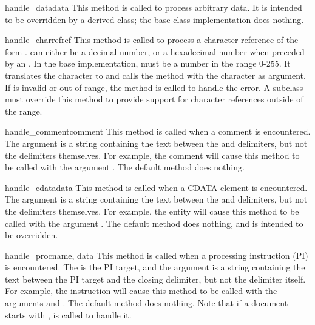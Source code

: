\begin{methoddesc}{handle_data}{data}
This method is called to process arbitrary data.  It is intended to be
overridden by a derived class; the base class implementation does
nothing.
\end{methoddesc}

\begin{methoddesc}{handle_charref}{ref}
This method is called to process a character reference of the form
.   can either be a decimal number,
or a hexadecimal number when preceded by an .
In the base implementation,  must be a number in the
range 0-255.  It translates the character to \ASCII{} and calls the
method  with the character as argument.  If
 is invalid or out of range, the method
 is called to handle the error.  A
subclass must override this method to provide support for character
references outside of the \ASCII{} range.
\end{methoddesc}

\begin{methoddesc}{handle_comment}{comment}
This method is called when a comment is encountered.  The
 argument is a string containing the text between the
\samp{<!--} and \samp{-->} delimiters, but not the delimiters
themselves.  For example, the comment  will
cause this method to be called with the argument .  The
default method does nothing.
\end{methoddesc}

\begin{methoddesc}{handle_cdata}{data}
This method is called when a CDATA element is encountered.  The
 argument is a string containing the text between the
\samp{<![CDATA[} and \samp{]]>} delimiters, but not the delimiters
themselves.  For example, the entity \samp{<![CDATA[text]]>} will
cause this method to be called with the argument .  The
default method does nothing, and is intended to be overridden.
\end{methoddesc}

\begin{methoddesc}{handle_proc}{name, data}
This method is called when a processing instruction (PI) is
encountered.  The  is the PI target, and the 
argument is a string containing the text between the PI target and the
closing delimiter, but not the delimiter itself.  For example, the
instruction  will cause this method to be called
with the arguments  and .  The default method
does nothing.  Note that if a document starts with ,  is called to handle it.
\end{methoddesc}

